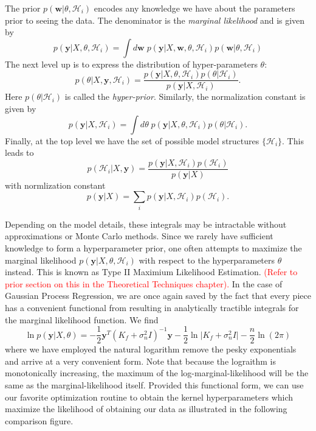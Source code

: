 The prior $p(\mathbf{w}\vert \theta, \mathcal{H}_i)$ encodes any knowledge we have about the parameters prior to seeing the data. The denominator is the \textit{marginal likelihood} and is given by
\begin{equation}
    p(\mathbf{y}\vert X, \theta, \mathcal{H}_i) = \int d\mathbf{w}\; p(\mathbf{y} \vert X, \mathbf{w}, \theta, \mathcal{H}_i)p(\mathbf{w}\vert \theta, \mathcal{H}_i)
\end{equation}
The next level up is to express the distribution of hyper-parameters $\theta$:
\begin{equation}
    p(\theta \vert X, \mathbf{y}, \mathcal{H}_i) = \frac{p(\mathbf{y}\vert X, \theta, \mathcal{H}_i)p(\theta \vert \mathcal{H}_i)}{p(\mathbf{y}\vert X, \mathcal{H}_i)}.
\end{equation}
Here $p(\theta \vert \mathcal{H}_i)$ is called the \textit{hyper-prior}. Similarly, the normalization constant is given by
\begin{equation}
    p(\mathbf{y}\vert X,\mathcal{H}_i) = \int d\theta \; p(\mathbf{y}\vert X, \theta, \mathcal{H}_i)p(\theta \vert \mathcal{H}_i).
\end{equation}
Finally, at the top level we have the set of possible model structures $\{\mathcal{H}_i\}$. This leads to
\begin{equation}
    p(\mathcal{H}_i \vert X, \mathbf{y}) = \frac{p(\mathbf{y} \vert X, \mathcal{H}_i)p(\mathcal{H}_i)}{p(\mathbf{y}\vert X)}
\end{equation}
with normlization constant
\begin{equation}
 p(\mathbf{y}\vert X) = \sum_i p(\mathbf{y} \vert X, \mathcal{H}_i)p(\mathcal{H}_i).
\end{equation}

Depending on the model details, these integrals may be intractable without approximations or Monte Carlo methods. Since we rarely have sufficient knowledge to form a hyperparameter prior, one often attempts to maximize the marginal likelihood $p(\mathbf{y} \vert X, \theta, \mathcal{H}_i)$ with respect to the hyperparameters $\theta$ instead. This is known as Type II Maximium Likelihood Estimation. \textcolor{red}{(Refer to prior section on this in the Theoretical Techniques chapter).} In the case of Gaussian Process Regression, we are once again saved by the fact that every piece has a convenient functional from resulting in analytically tractible integrals for the marginal likelihood function. We find
\begin{equation}
    \ln p(\mathbf{y}\vert X, \theta) = -\frac{1}{2}\mathbf{y}^T(K_f + \sigma_n^2 I)^{-1}\mathbf{y} - \frac{1}{2}\ln\lvert K_f + \sigma_n^2 I \rvert -\frac{n}{2}\ln(2\pi)
\end{equation}
where we have employed the natural logarithm remove the pesky exponentials and arrive at a very convenient form. Note that because the lograithm is monotonically increasing, the maximum of the log-marginal-likelihood will be the same as the marginal-likelihood itself. Provided this functional form, we can use our favorite optimization routine to obtain the kernel hyperparameters which maximize the likelihood of obtaining our data as illustrated in the following comparison figure.

